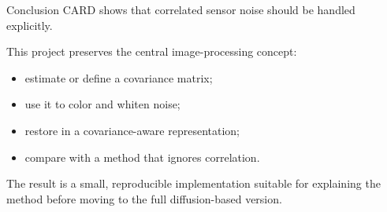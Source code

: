\documentclass[aspectratio=169]{beamer}
\begin{document}
\begin{frame}{Conclusion}
  CARD shows that correlated sensor noise should be handled explicitly.

  \vspace{0.4cm}
  This project preserves the central image-processing concept:
  \begin{itemize}
    \item estimate or define a covariance matrix;
    \item use it to color and whiten noise;
    \item restore in a covariance-aware representation;
    \item compare with a method that ignores correlation.
  \end{itemize}

  \vspace{0.3cm}
  The result is a small, reproducible implementation suitable for explaining
  the method before moving to the full diffusion-based version.
\end{frame}
\end{document}
